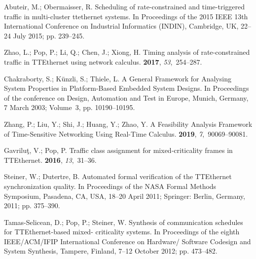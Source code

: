 \documentclass[electronics,article,accept,moreauthors,pdftex]{Definitions/mdpi}
\begin{document}
\begin{thebibliography}{999}
Abuteir, M.; Obermaisser, R.
\newblock Scheduling of rate-constrained and time-triggered traffic in
  multi-cluster ttethernet systems.
\newblock  In Proceedings of the 2015 IEEE 13th International Conference on Industrial Informatics
  (INDIN),  Cambridge, UK, 22--24 July 2015; pp. 239--245. %

Zhao, L.; Pop, P.; Li, Q.; Chen, J.; Xiong, H.
\newblock Timing analysis of rate-constrained traffic in TTEthernet using
  network calculus.
 {\bf 2017}, {\em 53},~254--287.

Chakraborty, S.; K{\"u}nzli, S.; Thiele, L.
\newblock A General Framework for Analysing System Properties in Platform-Based
  Embedded System Designs.
\newblock In  Proceedings of the conference on Design, Automation and Test in
  Europe, Munich, Germany, 7 March 2003; Volume~3, pp. 10190--10195. %

Zhang, P.; Liu, Y.; Shi, J.; Huang, Y.; Zhao, Y.
\newblock A Feasibility Analysis Framework of Time-Sensitive Networking Using
  Real-Time Calculus.
 {\bf 2019}, {\em 7},~90069--90081.

Gavrilu{\c{t}}, V.; Pop, P.
\newblock Traffic class assignment for mixed-criticality frames in TTEthernet.
 {\bf 2016}, {\em 13},~31--36.

Steiner, W.; Dutertre, B.
\newblock Automated formal verification of the TTEthernet synchronization
  quality.
\newblock  In  Proceedings of the NASA Formal Methods Symposium, Pasadena, CA, USA, 18--20 April 2011; Springer:  Berlin, Germany, 2011; pp. 375--390. %

Tamas-Selicean, D.; Pop, P.; Steiner, W.
\newblock Synthesis of communication schedules for TTEthernet-based
  mixed- criticality systems.
\newblock   In Proceedings of the eighth IEEE/ACM/IFIP International Conference on
  Hardware/ Software Codesign and System Synthesis, Tampere, Finland, 7--12 October 2012; pp. 473--482.%


\end{thebibliography}
\end{document}
